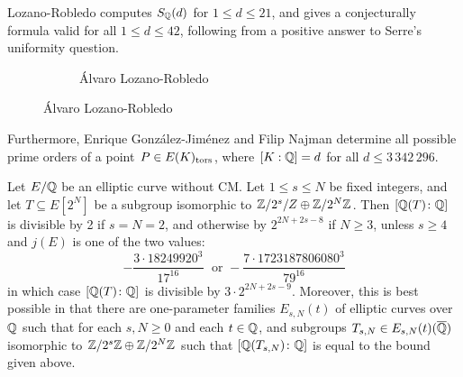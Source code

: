 \begin{frame}[plain]
\begin{rem}
Lozano-Robledo computes $S_{\mathbb{Q}}(d)$ for $1 \leq d \leq 21$, and gives a conjecturally formula valid for all $1 \leq d \leq 42$, following from a positive answer to Serre's uniformity question.
\end{rem}
	\begin{figure}[h]
	\centering
	\begin{subfigure}{\textwidth}
	\captionsetup{labelformat=empty}
	\centering
	\caption{\'Alvaro Lozano-Robledo}
	\end{subfigure}
	\end{figure}
\begin{rem}
Furthermore, Enrique Gonz\'alez-Jim\'enez and Filip Najman determine all possible prime orders of a point $P \in E(K)_{\text{tors}}$, where $[K : \mathbb{Q}]= d$ for all $d \leq 3\,342\,296$.
\end{rem}
\end{frame}



\begin{frame}[plain]
\begin{thm}
Let $E/\mathbb{Q}$ be an elliptic curve without CM. Let $1 \leq s \leq N$ be fixed integers, and let $T \subseteq E[2^N]$ be a subgroup isomorphic to $\mathbb{Z}/2^s/Z \oplus \mathbb{Z}/2^N \mathbb{Z}$. Then $[\mathbb{Q}(T) \colon \mathbb{Q}]$ is divisible by 2 if $s=N=2$, and otherwise by $2^{2N+2s-8}$ if $N \geq 3$, unless $s \geq 4$ and $j(E)$ is one of the two values:
	\[
	- \dfrac{3 \cdot 18249920^3}{17^{16}}\; \text{ or } - \dfrac{7 \cdot 1723187806080^3}{79^{16}}
	\]
in which case $[\mathbb{Q}(T) \colon \mathbb{Q}]$ is divisible by $3 \cdot 2^{2N+2s-9}$. Moreover, this is best possible in that there are one-parameter families $E_{s,N}(t)$ of elliptic curves over $\mathbb{Q}$ such that for each $s, N \geq 0$ and each $t \in \mathbb{Q}$, and subgroups $T_{s,N} \in E_{s,N}(t)(\overline{\mathbb{Q}})$ isomorphic to $\mathbb{Z}/2^s\mathbb{Z} \oplus \mathbb{Z}/2^N\mathbb{Z}$ such that $[\mathbb{Q}(T_{s,N}) \colon \mathbb{Q}]$ is equal to the bound given above. 
\end{thm}
\end{frame}



